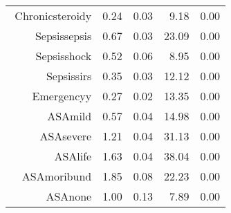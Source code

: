 \begin{tabular}{rrrrr}
$$  Chronic\-steroid\-y & 0.24 & 0.03 & 9.18 & 0.00 \\ 
  Sepsis\-sepsis & 0.67 & 0.03 & 23.09 & 0.00 \\ 
  Sepsis\-shock & 0.52 & 0.06 & 8.95 & 0.00 \\ 
  Sepsis\-sirs & 0.35 & 0.03 & 12.12 & 0.00 \\ 
  Emergency\-y & 0.27 & 0.02 & 13.35 & 0.00 \\ 
  ASA\-mild & 0.57 & 0.04 & 14.98 & 0.00 \\ 
  ASA\-severe & 1.21 & 0.04 & 31.13 & 0.00 \\ 
  ASA\-life & 1.63 & 0.04 & 38.04 & 0.00 \\ 
  ASA\-moribund & 1.85 & 0.08 & 22.23 & 0.00 \\ 
  ASA\-none & 1.00 & 0.13 & 7.89 & 0.00 \\ 
   \hline
\end{tabular}

